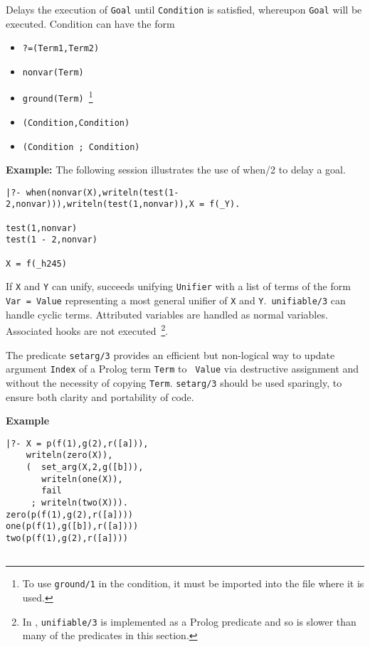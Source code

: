 \begin{description}
%
Delays the execution of {\tt Goal} until {\tt Condition} is satisfied,
whereupon {\tt Goal} will be executed.  Condition can have the form
\begin{itemize}
\item {\tt ?=(Term1,Term2)}
\item {\tt nonvar(Term)}
\item {\tt ground(Term)}~\footnote{To use {\tt ground/1} in the
condition, it must be imported into the file where it is used.}
\item {\tt (Condition,Condition)}
\item {\tt (Condition ; Condition)}
\end{itemize}

{\bf Example:} The following session illustrates the use of when/2 to
delay a goal.
%
\begin{small}
\begin{verbatim}
|?- when(nonvar(X),writeln(test(1-2,nonvar))),writeln(test(1,nonvar)),X = f(_Y).

test(1,nonvar)
test(1 - 2,nonvar)

X = f(_h245)
\end{verbatim}
\end{small}

%
If {\tt X} and {\tt Y} can unify, succeeds unifying {\tt Unifier} with
a list of terms of the form {\tt Var = Value} representing a most
general unifier of {\tt X} and {\tt Y}.\  {\tt unifiable/3} can handle
cyclic terms. Attributed variables are handled as normal
variables. Associated hooks are not executed~\footnote{In \version ,
  {\tt unifiable/3} is implemented as a Prolog predicate and so is slower
  than many of the predicates in this section.}.

%
The predicate {\tt setarg/3} provides an efficient but non-logical way
to update argument {\tt Index} of a Prolog term {\tt Term} to {\tt
  Value} via destructive assignment and without the necessity of
copying {\tt Term}.  {\tt setarg/3} should be used sparingly, to
ensure both clarity and portability of code.

{\bf Example}
{\small
\begin{verbatim}
|?- X = p(f(1),g(2),r([a])),
    writeln(zero(X)),
    (  set_arg(X,2,g([b])),
       writeln(one(X)),
       fail
     ; writeln(two(X))).
zero(p(f(1),g(2),r([a])))
one(p(f(1),g([b]),r([a])))
two(p(f(1),g(2),r([a])))


\end{verbatim}}
\end{description}
